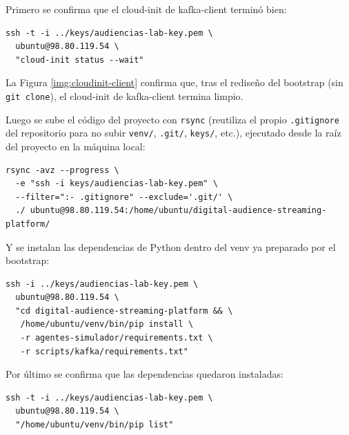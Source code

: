 Primero se confirma que el cloud-init de kafka-client terminó bien:

\begin{lstlisting}[style=cmdbox]
ssh -t -i ../keys/audiencias-lab-key.pem \
  ubuntu@98.80.119.54 \
  "cloud-init status --wait"
\end{lstlisting}

La Figura \ref{img:cloudinit-client} confirma que, tras el rediseño del bootstrap (sin \texttt{git clone}), el cloud-init de kafka-client termina limpio.


Luego se sube el código del proyecto con \texttt{rsync} (reutiliza el propio \texttt{.gitignore} del repositorio para no subir \texttt{venv/}, \texttt{.git/}, \texttt{keys/}, etc.), ejecutado desde la raíz del proyecto en la máquina local:

\begin{lstlisting}[style=cmdbox]
rsync -avz --progress \
  -e "ssh -i keys/audiencias-lab-key.pem" \
  --filter=":- .gitignore" --exclude='.git/' \
  ./ ubuntu@98.80.119.54:/home/ubuntu/digital-audience-streaming-platform/
\end{lstlisting}


Y se instalan las dependencias de Python dentro del venv ya preparado por el bootstrap:

\begin{lstlisting}[style=cmdbox]
ssh -i ../keys/audiencias-lab-key.pem \
  ubuntu@98.80.119.54 \
  "cd digital-audience-streaming-platform && \
   /home/ubuntu/venv/bin/pip install \
   -r agentes-simulador/requirements.txt \
   -r scripts/kafka/requirements.txt"
\end{lstlisting}


Por último se confirma que las dependencias quedaron instaladas:

\begin{lstlisting}[style=cmdbox]
ssh -t -i ../keys/audiencias-lab-key.pem \
  ubuntu@98.80.119.54 \
  "/home/ubuntu/venv/bin/pip list"
\end{lstlisting}

